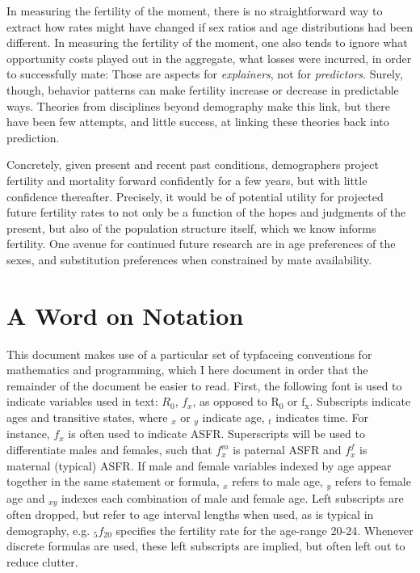 \documentclass[reqno,12pt,oneside,a4paper]{report} %
\theoremstyle{plain}
\theoremstyle{definition}
\theoremstyle{remark}
\numberwithin{theorem}{chapter}     %
\begin{document}
In measuring the fertility of the moment, there is no straightforward way to extract how rates might have changed if sex ratios and age distributions had been different. In measuring the fertility of the moment, one also tends to ignore what opportunity costs played out in the aggregate, what losses were incurred, in order to successfully mate: Those are aspects for \textit{explainers}, not for \textit{predictors}. Surely, though, behavior patterns can make fertility increase or decrease in predictable ways. Theories from disciplines beyond demography make this link, but there have been few attempts, and little success, at linking these theories back into prediction. 

Concretely, given present and recent past conditions, demographers project fertility and mortality forward confidently for a few years, but with little confidence thereafter. Precisely, it would be of potential utility for projected future fertility rates to not only be a function of the hopes and judgments of the present, but also of the population structure itself, which we know informs fertility. One avenue for continued future research are in age preferences of the sexes, and substitution preferences when constrained by mate availability. 

\section{A Word on Notation}
This document makes use of a particular set of typfaceing conventions for mathematics and programming, which I here document in order that the remainder of the document be easier to read. First, the following font is used to indicate variables used in text: $R_0$, $f_x$, as opposed to $\text{R}_{\text{0}}$ or $\text{f}_{\text{x}}$. Subscripts indicate ages and transitive states, where ${}_x$ or ${}_y$ indicate age, ${}_t$ indicates time. For instance, $f_x$ is often used to indicate ASFR. Superscripts will be used to differentiate males and females, such that $f_x ^m$ is paternal ASFR and $f_x ^f$ is maternal (typical) ASFR. If male and female variables indexed by age appear together in the same statement or formula, ${}_x$ refers to male age, ${}_y$ refers to female age and ${}_{xy}$ indexes each combination of male and female age. Left subscripts are often dropped, but refer to age interval lengths when used, as is typical in demography, e.g. ${}_5f_20$ specifies the fertility rate for the age-range 20-24. Whenever discrete formulas are used, these left subscripts are implied, but often left out to reduce clutter.
\end{document}
